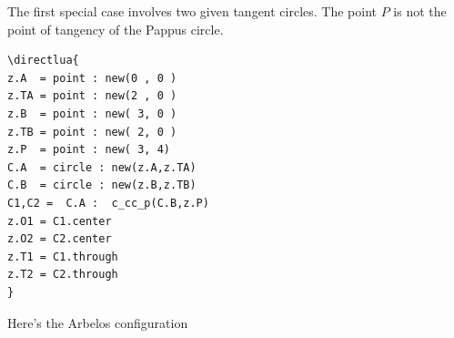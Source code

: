 \vspace{6pt}
The first special case involves two given tangent circles. The point $P$ is not the point of tangency of the Pappus circle.

\vspace{6pt}
\begin{minipage}{0.5\textwidth}
\begin{Verbatim}
\directlua{
z.A  = point : new(0 , 0 )
z.TA = point : new(2 , 0 )
z.B  = point : new( 3, 0 )
z.TB = point : new( 2, 0 )
z.P  = point : new( 3, 4)
C.A  = circle : new(z.A,z.TA)
C.B  = circle : new(z.B,z.TB)
C1,C2 =  C.A :  c_cc_p(C.B,z.P)
z.O1 = C1.center
z.O2 = C2.center
z.T1 = C1.through
z.T2 = C2.through
}   
\end{Verbatim}
\end{minipage}
\begin{minipage}{0.5\textwidth}
\end{minipage}

\vspace{6pt}

Here's the Arbelos configuration


